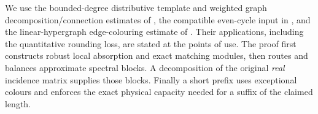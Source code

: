 We use the bounded-degree distributive template and weighted graph decomposition/connection estimates of \cite[Section 3.9]{Montgomery}, the compatible even-cycle input in \cite[Theorem 3.4]{BMMP}, and the linear-hypergraph edge-colouring estimate of \cite{MolloyReed}. Their applications, including the quantitative rounding loss, are stated at the points of use. The proof first constructs robust local absorption and exact matching modules, then routes and balances approximate spectral blocks. A decomposition of the original \emph{real} incidence matrix supplies those blocks. Finally a short prefix uses exceptional colours and enforces the exact physical capacity needed for a suffix of the claimed length.
